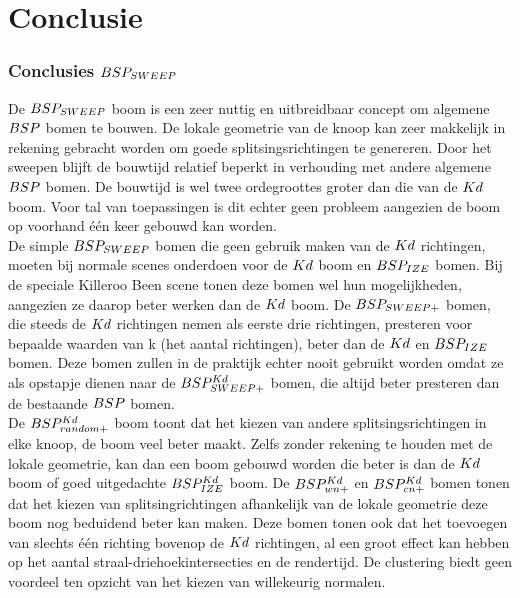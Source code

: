 \chapter{Conclusie}
\label{hoofdstuk:conclusie}

\subsection{Conclusies $BSP_{SWEEP}$}
De $BSP_{SWEEP}$ boom is een zeer nuttig en uitbreidbaar concept om algemene $BSP$ bomen te bouwen.
De lokale geometrie van de knoop kan zeer makkelijk in rekening gebracht worden om goede splitsingsrichtingen te genereren.
Door het sweepen blijft de bouwtijd relatief beperkt in verhouding met andere algemene $BSP$ bomen.
De bouwtijd is wel twee ordegroottes groter dan die van de $Kd$ boom.
Voor tal van toepassingen is dit echter geen probleem aangezien de boom op voorhand één keer gebouwd kan worden.\\

De simple $BSP_{SWEEP}$ bomen die geen gebruik maken van de $Kd$ richtingen, moeten bij normale scenes onderdoen voor de $Kd$ boom en $BSP_{IZE}$ bomen.
Bij de speciale Killeroo Been scene tonen deze bomen wel hun mogelijkheden, aangezien ze daarop beter werken dan de $Kd$ boom.
De $BSP_{SWEEP+}$ bomen, die steeds de $Kd$ richtingen nemen als eerste drie richtingen, presteren voor bepaalde waarden van k (het aantal richtingen), beter dan de $Kd$ en $BSP_{IZE}$ bomen.
Deze bomen zullen in de praktijk echter nooit gebruikt worden omdat ze als opstapje dienen naar de $BSP^{Kd}_{SWEEP+}$ bomen, die altijd beter presteren dan de bestaande $BSP$ bomen.\\

De $BSP^{Kd}_{random+}$ boom toont dat het kiezen van andere splitsingsrichtingen in elke knoop, de boom veel beter maakt. 
Zelfs zonder rekening te houden met de lokale geometrie, kan dan een boom gebouwd worden die beter is dan de $Kd$ boom of goed uitgedachte $BSP^{Kd}_{IZE}$ boom.
De $BSP^{Kd}_{wn+}$ en $BSP^{Kd}_{cn+}$ bomen tonen dat het kiezen van splitsingrichtingen afhankelijk van de lokale geometrie deze boom nog beduidend beter kan maken.
Deze bomen tonen ook dat het toevoegen van slechts één richting bovenop de $Kd$ richtingen, al een groot effect kan hebben op het aantal straal-driehoekintersecties en de rendertijd.
De clustering biedt geen voordeel ten opzicht van het kiezen van willekeurig normalen.

